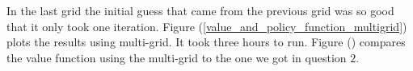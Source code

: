 \documentclass[a4paper,12pt]{article}
\begin{document}
        
        
    
    
    In the last grid the initial guess that came from the previous grid was so good that it only took one iteration. Figure (\ref{value_and_policy_function_multigrid}) plots the results using multi-grid. It took three hours to run. Figure () compares the value function using the multi-grid to the one we got in question $2$.
    
\end{document}
